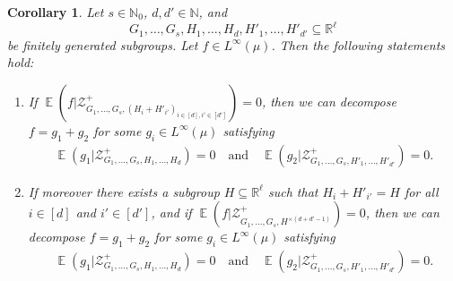 \documentclass[11pt]{amsart}
\newtheorem{corollary}[lemma]{Corollary}
\theoremstyle{definition}
\DeclareMathOperator*{\E}{\mathbb{E}}
\newcommand{\N}{{\mathbb N}}
\newcommand{\R}{{\mathbb R}}
\newcommand{\Z}{{\mathbb Z}}
\newcommand{\CD}{{\mathcal D}}
\newcommand{\CZ}{{\mathcal Z}}
\newcommand{\nnorm}[1]{\lvert\!|\!| #1|\!|\!\rvert}
\newcommand{\1}{{\mathbf{1}}}
\begin{document}
\begin{corollary}\label{C: relative concatenation}
    Let $s\in\N_0$, $d,d'\in\N$, and $$G_1, \ldots, G_s, H_1, \ldots, H_d, H'_1, \ldots, H'_{d'}\subseteq\R^\ell$$ be finitely generated subgroups. Let $f\in L^\infty(\mu)$. Then the following statements hold:
    \begin{enumerate}
        \item If $\E(f|\mathcal{Z}^+_{G_{1},\dots,G_{s},(H_{i}+H'_{i'})_{i\in[d], i'\in[d']}})=0$, then we can decompose $f = g_1 + g_2$ for some $g_i\in L^\infty(\mu)$ satisfying
        \begin{align*}
            \E(g_1|\mathcal{Z}^+_{G_{1},\dots,G_s,H_{1},\dots,H_{d}}) = 0\quad\textrm{and}\quad \E(g_2|\mathcal{Z}^+_{G_{1},\dots,G_s,H'_{1},\dots,H'_{d'}}) = 0.
        \end{align*}
        \item If moreover there exists a subgroup $H\subseteq \R^\ell$ such that $H_i + H'_{i'} = H$ for all $i\in[d]$ and $i'\in[d']$, and if $\E(f|\CZ^{+}_{G_{1},\dots,G_s, H^{\times (d+d'-1)}})=0$, then we can decompose $f = g_1 + g_2$ for some $g_i\in L^\infty(\mu)$ satisfying
        \begin{align*}
            \E(g_1|\mathcal{Z}^+_{G_{1},\dots,G_s, H_{1},\dots,H_{d}}) = 0\quad\textrm{and}\quad \E(g_2|\mathcal{Z}^+_{G_{1},\dots,G_s,H'_{1},\dots,H'_{d'}})=0.
        \end{align*}
    \end{enumerate}
\end{corollary}

\end{document}
